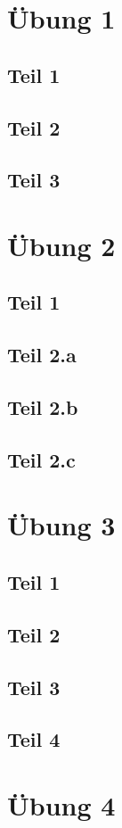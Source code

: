 \documentclass[10pt,a4paper]{article}
\begin{document}
\section{Übung 1}

\subsection{Teil 1}

\subsection{Teil 2}

\subsection{Teil 3}

\section{Übung 2}

\subsection{Teil 1}

\subsection{Teil 2.a}

\subsection{Teil 2.b}

\subsection{Teil 2.c}

\section{Übung 3}

\subsection{Teil 1}

\subsection{Teil 2}

\subsection{Teil 3}

\subsection{Teil 4}

\section{Übung 4}
\end{document}

